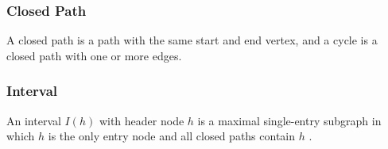 \subsubsection{Closed Path}

A closed path is a path with the same start and end vertex, and a cycle is a closed path with one or more edges.


\subsubsection{Interval}


An interval $I(h)$ with header node $h$ is a maximal single-entry subgraph in which $h$ is the only entry node and all closed paths contain $h$ \cite{structuring_algorithm_for_decompilation}.
